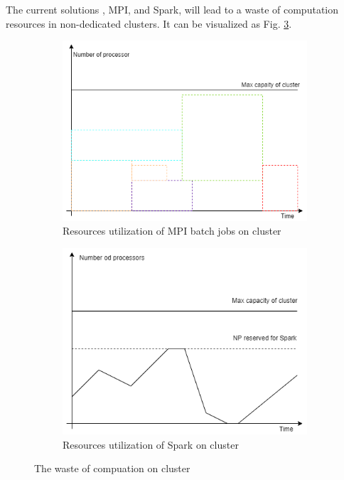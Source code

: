 \documentclass[sigchi]{acmart}
\begin{document}
The current solutions , MPI, and Spark, will lead to a waste of computation resources in non-dedicated clusters. It can be visualized as Fig. \ref{fig:waste_cluster}.
\begin{figure}[h!]
  \begin{subfigure}[b]{0.45\textwidth}
      \includegraphics[width=\textwidth]{img/MPI_batch.png}
      \caption{Resources utilization of MPI batch jobs on cluster}
      \label{fig:MPI_batch}
  \end{subfigure}
  \begin{subfigure}[b]{0.45\textwidth}
      \includegraphics[width=\textwidth]{img/spark_NP.png}
      \caption{Resources utilization of Spark on cluster}
      \label{fig:spark_np}
  \end{subfigure}
  \caption{The waste of compuation on cluster}\label{fig:waste_cluster}
\end{figure}
\end{document}
